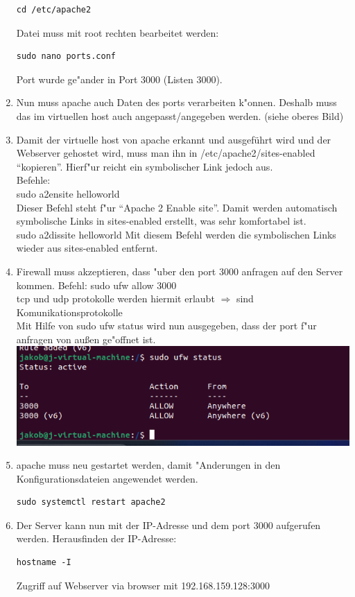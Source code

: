 \documentclass[a4paper,11pt,titlepage]{article}
\begin{document}
\begin{enumerate}
\begin{verbatim}cd /etc/apache2\end{verbatim}
Datei muss mit root rechten bearbeitet werden:
\begin{verbatim}sudo nano ports.conf\end{verbatim}
Port wurde ge"ander in Port 3000 (Listen 3000).
\item Nun muss apache auch Daten des ports verarbeiten k"onnen. Deshalb muss das im virtuellen host auch angepasst/angegeben werden. (siehe oberes Bild)
\item Damit der virtuelle host von apache erkannt und ausgeführt wird und der Webserver gehostet wird, muss man ihn in /etc/apache2/sites-enabled "`kopieren"'. Hierf"ur reicht ein symbolischer Link jedoch aus.\\
Befehle:\\
sudo a2ensite helloworld\\
Dieser Befehl steht f"ur "`Apache 2 Enable site"'. Damit werden automatisch symbolische Links in sites-enabled erstellt, was sehr komfortabel ist.\\
sudo a2dissite helloworld
Mit diesem Befehl werden die symbolischen Links wieder aus sites-enabled entfernt.
\item Firewall muss akzeptieren, dass "uber den port 3000 anfragen auf den Server kommen. 
Befehl: sudo ufw allow 3000\\
tcp und udp protokolle werden hiermit erlaubt $\Rightarrow$ sind Komunikationsprotokolle\\
Mit Hilfe von sudo ufw status wird nun ausgegeben, dass der port f"ur anfragen von außen ge"offnet ist.\\
\includegraphics [width = 10 cm] {Status-Firewall.png}
\item apache muss neu gestartet werden, damit "Anderungen in den Konfigurationsdateien angewendet werden.
\begin{verbatim}sudo systemctl restart apache2\end{verbatim}
\item Der Server kann nun mit der IP-Adresse und dem port 3000 aufgerufen werden.
Herausfinden der IP-Adresse: 
\begin{verbatim}hostname -I\end{verbatim}
Zugriff auf Webserver via browser mit 192.168.159.128:3000
\end{enumerate}
\end{document}
